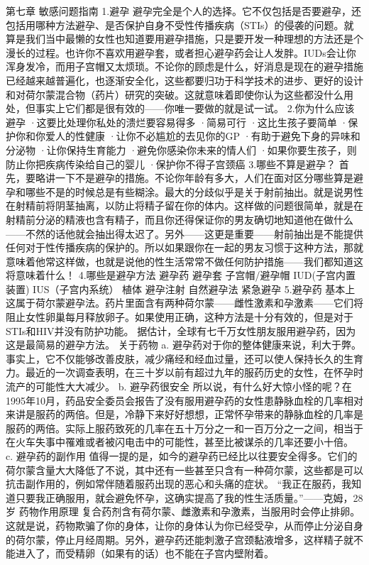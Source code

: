 \documentclass[12pt,UTF8]{ctexbook}
\begin{document}
第七章 敏感问题指南
1.避孕
避孕完全是个人的选择。它不仅包括是否要避孕，还包括用哪种方法避孕、是否保护自身不受性传播疾病（STIs）的侵袭的问题。就算是我们当中最懒的女性也知道要用避孕措施，只是要开发一种理想的方法还是个漫长的过程。也许你不喜欢用避孕套，或者担心避孕药会让人发胖。IUDs会让你浑身发冷，而用子宫帽又太烦琐。不论你的顾虑是什么，好消息是现在的避孕措施已经越来越普遍化，也逐渐安全化，这些都要归功于科学技术的进步、更好的设计和对荷尔蒙混合物（药片）研究的突破。这就意味着即使你认为这些都没什么用处，但事实上它们都是很有效的——你唯一要做的就是试一试。
2.你为什么应该避孕
·这要比处理你私处的溃烂要容易得多
·简易可行
·这比生孩子要简单
·保护你和你爱人的性健康
·让你不必尴尬的去见你的GP
·有助于避免下身的异味和分泌物
·让你保持生育能力
·避免你感染你未来的情人们
·如果你要生孩子，则防止你把疾病传染给自己的婴儿
·保护你不得子宫颈癌
3.哪些不算是避孕？
首先，要略讲一下不是避孕的措施。不论你年龄有多大，人们在面对区分哪些算是避孕和哪些不是的时候总是有些糊涂。最大的分歧似乎是关于射前抽出。就是说男性在射精前将阴茎抽离，以防止将精子留在你的体内。这样做的问题很简单，就是在射精前分泌的精液也含有精子，而且你还得保证你的男友确切地知道他在做什么——不然的话他就会抽出得太迟了。另外——这更是重要——射前抽出是不能提供任何对于性传播疾病的保护的。所以如果跟你在一起的男友习惯于这种方法，那就意味着他常这样做，也就是说他的性生活常常不做任何防护措施——我们都知道这将意味着什么！
4.哪些是避孕方法
避孕药
避孕套
子宫帽/避孕帽
IUD(子宫内置装置)
IUS（子宫内系统）
植体
避孕注射
自然避孕法
紧急避孕
5.避孕药
基本上这属于荷尔蒙避孕法。药片里面含有两种荷尔蒙——雌性激素和孕激素——它们将阻止女性卵巢每月释放卵子。如果使用正确，这种方法是十分有效的，但是对于STIs和HIV并没有防护功能。
据估计，全球有七千万女性朋友服用避孕药，因为这是最简易的避孕方法。
关于药物
a. 避孕药对于你的整体健康来说，利大于弊。
事实上，它不仅能够改善皮肤，减少痛经和经血过量，还可以使人保持长久的生育力。最近的一次调查表明，在三十岁以前有超过九年的服药历史的女性，在怀孕时流产的可能性大大减少。
b. 避孕药很安全
所以说，有什么好大惊小怪的呢？在1995年10月，药品安全委员会报告了没有服用避孕药的女性患静脉血栓的几率相对来讲是服药的两倍。但是，冷静下来好好想想，正常怀孕带来的静脉血栓的几率是服药的两倍。实际上服药致死的几率在五十万分之一和一百万分之一之间，相当于在火车失事中罹难或者被闪电击中的可能性，甚至比被谋杀的几率还要小十倍。
c. 避孕药的副作用
值得一提的是，如今的避孕药已经比以往要安全得多。它们的荷尔蒙含量大大降低了不说，其中还有一些甚至只含有一种荷尔蒙，这些都是可以抗击副作用的，例如常伴随着服药出现的恶心和头痛的症状。
“我正在服药，我知道只要我正确服用，就会避免怀孕，这确实提高了我的性生活质量。”——克姆，28岁
药物作用原理
复合药剂含有荷尔蒙、雌激素和孕激素，当服用时会停止排卵。这就是说，药物欺骗了你的身体，让你的身体认为你已经受孕，从而停止分泌自身的荷尔蒙，停止月经周期。另外，避孕药还能刺激子宫颈黏液增多，这样精子就不能进入了，而受精卵（如果有的话）也不能在子宫内壁附着。
\end{document}
